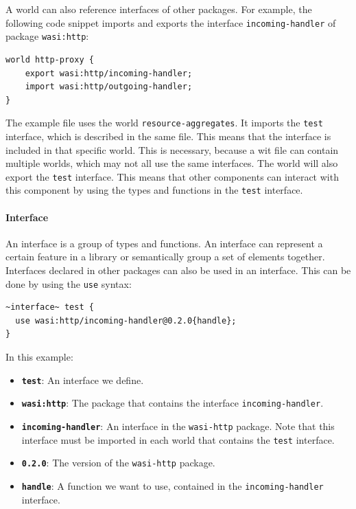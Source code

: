 A world can also reference interfaces of other packages. For example, the following code snippet imports and exports the interface \texttt{incoming-handler} of package \texttt{wasi:http}:
\begin{lstlisting}[language=wit]
world http-proxy {
    export wasi:http/incoming-handler;
    import wasi:http/outgoing-handler;
}
\end{lstlisting}

The example file uses the world \texttt{resource-aggregates}. It imports the \texttt{test} interface, which is described in the same file. This means that the interface is included in that specific world. This is necessary, because a wit file can contain multiple worlds, which may not all use the same interfaces. The world will also export the \texttt{test} interface. This means that other components can interact with this component by using the types and functions in the \texttt{test} interface.

\paragraph{Interface}
An interface is a group of types and functions. An interface can represent a certain feature in a library or semantically group a set of elements together. Interfaces declared in other packages can also be used in an interface. This can be done by using the \texttt{use} syntax:
\begin{lstlisting}[language=wit]
~interface~ test {
  use wasi:http/incoming-handler@0.2.0{handle};
}
\end{lstlisting}

In this example:
\begin{itemize}
\item \textbf{\texttt{test}}: An interface we define.
\item \textbf{\texttt{wasi:http}}: The package that contains the interface \texttt{incoming-handler}.
\item \textbf{\texttt{incoming-handler}}: An interface in the \texttt{wasi-http} package. Note that this interface must be imported in each world that contains the \texttt{test} interface.
\item \textbf{\texttt{0.2.0}}: The version of the \texttt{wasi-http} package.
\item \textbf{\texttt{handle}}: A function we want to use, contained in the \texttt{incoming-handler} interface.
\end{itemize}


